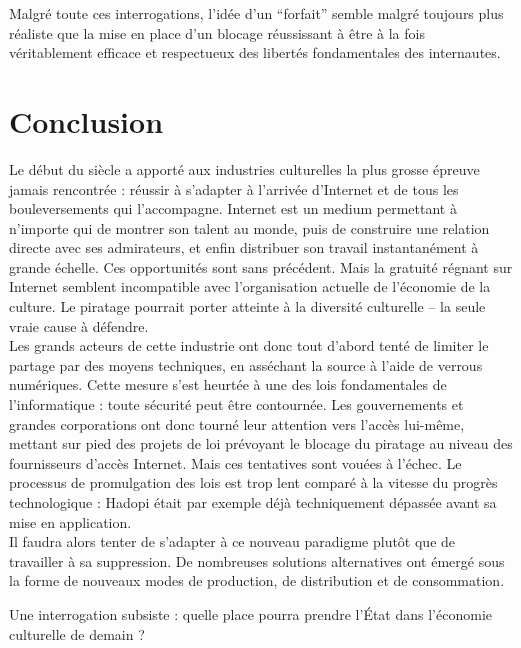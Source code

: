 \documentclass[a4paper]{report}
\begin{document}
	Malgré toute ces interrogations, l'idée d'un ``forfait'' semble malgré toujours plus réaliste que la mise en place d'un blocage réussissant à être à la fois véritablement efficace et respectueux des libertés fondamentales des internautes.





	\chapter{Conclusion}
	Le début du siècle a apporté aux industries culturelles la plus grosse épreuve jamais rencontrée : réussir à s'adapter à l'arrivée d'Internet et de tous les bouleversements qui l'accompagne. Internet est un medium permettant à n'importe qui de montrer son talent au monde, puis de construire une relation directe avec ses admirateurs, et enfin distribuer son travail instantanément à grande échelle. Ces opportunités sont sans précédent. Mais la gratuité régnant sur Internet semblent incompatible avec l'organisation actuelle de l'économie de la culture. Le piratage pourrait porter atteinte à la diversité culturelle – la seule vraie cause à défendre.\\

	Les grands acteurs de cette industrie ont donc tout d'abord tenté de limiter le partage par des moyens techniques, en asséchant la source à l'aide de verrous numériques. Cette mesure s'est heurtée à une des lois fondamentales de l'informatique : toute sécurité peut être contournée. Les gouvernements et grandes corporations ont donc tourné leur attention vers l'accès lui-même, mettant sur pied des projets de loi prévoyant le blocage du piratage au niveau des fournisseurs d'accès Internet. Mais ces tentatives sont vouées à l'échec. Le processus de promulgation des lois est trop lent comparé à la vitesse du progrès technologique : Hadopi était par exemple déjà techniquement dépassée avant sa mise en application.\\

	Il faudra alors tenter de s'adapter à ce nouveau paradigme plutôt que de travailler à sa suppression. De nombreuses solutions alternatives ont émergé sous la forme de nouveaux modes de production, de distribution et de consommation.
	
	Une interrogation subsiste : quelle place pourra prendre l'État dans l'économie culturelle de demain ?




	
	




\end{document}
